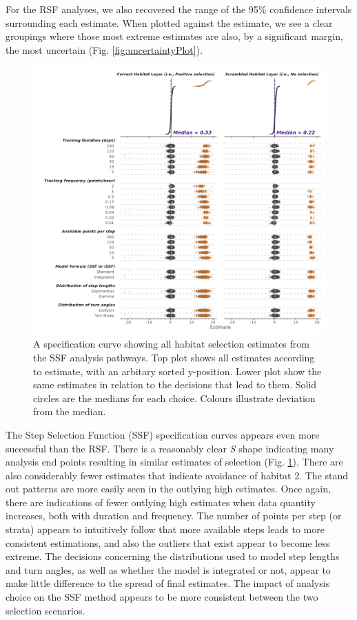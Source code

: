 \documentclass[10pt,a4paper]{article}
\begin{document}
For the RSF analyses, we also recovered the range of the 95\% confidence intervals surrounding each estimate.
When plotted against the estimate, we see a clear groupings where those most extreme estimates are also, by a significant margin, the most uncertain (Fig. \ref{fig:uncertaintyPlot}).

\begin{figure}
\includegraphics[width=1\linewidth]{../figures/ssfSpecCurve} \caption{A specification curve showing all habitat selection estimates from the SSF analysis pathways. Top plot shows all estimates according to estimate, with an arbitary sorted y-position. Lower plot show the same estimates in relation to the decisions that lead to them. Solid circles are the medians for each choice. Colours illustrate deviation from the median.}\label{fig:specCurveSSF}
\end{figure}

The Step Selection Function (SSF) specification curves appears even more successful than the RSF.
There is a reasonably clear \emph{S} shape indicating many analysis end points resulting in similar estimates of selection (Fig. \ref{fig:specCurveSSF}).
There are also considerably fewer estimates that indicate avoidance of habitat 2.
The stand out patterns are more easily seen in the outlying high estimates.
Once again, there are indications of fewer outlying high estimates when data quantity increases, both with duration and frequency.
The number of points per step (or strata) appears to intuitively follow that more available steps leads to more consistent estimations, and also the outliers that exist appear to become less extreme.
The decisions concerning the distributions used to model step lengths and turn angles, as well as whether the model is integrated or not, appear to make little difference to the spread of final estimates.
The impact of analysis choice on the SSF method appears to be more consistent between the two selection scenarios.
\end{document}
